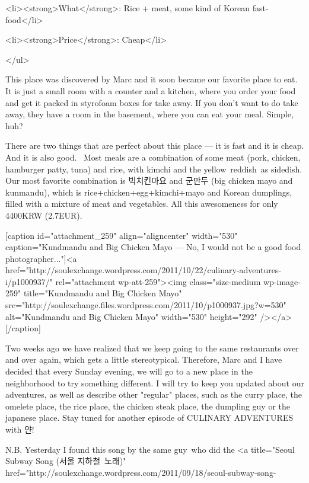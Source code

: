 \begin{post}
\begin{content}
	<li><strong>What</strong>: Rice + meat, some kind of Korean fast-food</li>

	<li><strong>Price</strong>: Cheap</li>

</ul>

This place was discovered by Marc and it soon became our favorite place to eat. It is just a small room with a counter and a kitchen, where you order your food and get it packed in styrofoam boxes for take away. If you don't want to do take away, they have a room in the basement, where you can eat your meal. Simple, huh?



There are two things that are perfect about this place — it is fast and it is cheap. And it is also good.  Most meals are a combination of some meat (pork, chicken, hamburger patty, tuna) and rice, with kimchi and the yellow reddish as sidedish. Our most favorite combination is 빅치킨마요 and 군만두 (big chicken mayo and kunmandu), which is rice+chicken+egg+kimchi+mayo and Korean dumplings, filled with a mixture of meat and vegetables. All this awesomeness for only 4400KRW (2.7EUR).



[caption id="attachment_259" align="aligncenter" width="530" caption="Kundmandu and Big Chicken Mayo — No, I would not be a good food photographer..."]<a href="http://soulexchange.wordpress.com/2011/10/22/culinary-adventures-i/p1000937/" rel="attachment wp-att-259"><img class="size-medium wp-image-259" title="Kundmandu and Big Chicken Mayo" src="http://soulexchange.files.wordpress.com/2011/10/p1000937.jpg?w=530" alt="Kundmandu and Big Chicken Mayo" width="530" height="292" /></a>[/caption]



Two weeks ago we have realized that we keep going to the same restaurants over and over again, which gets a little stereotypical. Therefore, Marc and I have decided that every Sunday evening, we will go to a new place in the neighborhood to try something different. I will try to keep you updated about our adventures, as well as describe other "regular" places, such as the curry place, the omelete place, the rice place, the chicken steak place, the dumpling guy or the japanese place. Stay tuned for another episode of CULINARY ADVENTURES with 얀!



N.B. Yesterday I found this song by the same guy who did the <a title="Seoul Subway Song (서울 지하철 노래)" href="http://soulexchange.wordpress.com/2011/09/18/seoul-subway-song-%




\end{content}
\end{post}
